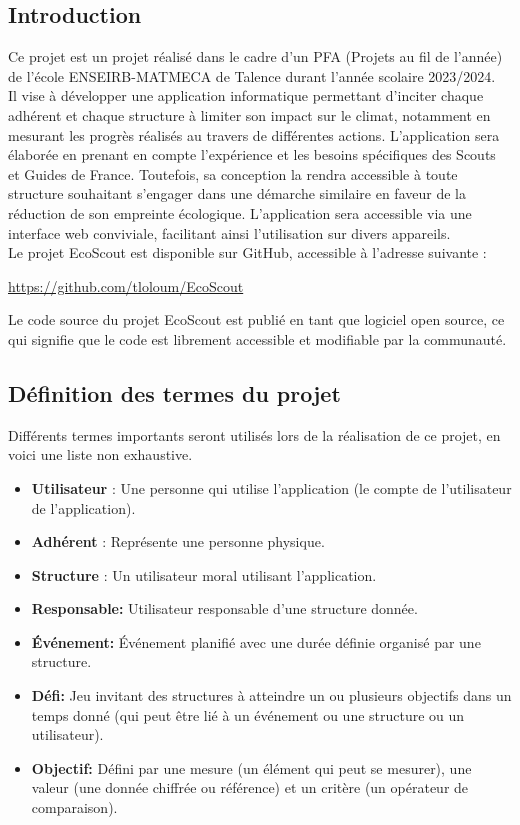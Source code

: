\subsection{Introduction}
Ce projet est un projet réalisé dans le cadre d'un PFA (Projets au fil de l'année)
de l'école ENSEIRB-MATMECA de Talence durant l'année scolaire 2023/2024. \\
\newline
Il vise à développer une application informatique permettant d’inciter chaque adhérent
et chaque structure à limiter son impact sur le climat, notamment en mesurant les 
progrès réalisés au travers de différentes actions. L'application sera élaborée en prenant en compte l'expérience et les besoins spécifiques des Scouts et Guides de France. Toutefois, sa conception la rendra accessible à toute structure souhaitant s'engager dans une démarche similaire en faveur de la réduction de son empreinte écologique. L'application sera accessible via une interface web conviviale, facilitant ainsi l'utilisation sur divers appareils. 
\\
\newline
Le projet EcoScout est disponible sur GitHub, accessible à l'adresse suivante :
\begin{center}
    \url{https://github.com/tloloum/EcoScout}
\end{center}
Le code source du projet EcoScout est publié en tant que logiciel open source, 
ce qui signifie que le code est librement accessible et modifiable par la communauté. 


\subsection{Définition des termes du projet}

Différents termes importants seront utilisés lors de la réalisation de ce projet, en voici une liste non exhaustive.
\begin{itemize}
    \item \textbf{Utilisateur} : Une personne qui utilise l'application (le compte de l'utilisateur de l'application).
    \item \textbf{Adhérent} : Représente une personne physique.
    \item \textbf{Structure} : Un utilisateur moral utilisant l'application.
    \item \textbf{Responsable:} Utilisateur responsable d'une structure donnée.
    \item \textbf{Événement:} Événement planifié avec une durée définie organisé par une structure.
    \item \textbf{Défi:} Jeu invitant des structures à atteindre un ou plusieurs objectifs dans un temps donné (qui peut être lié à un événement ou une structure ou un utilisateur).
    \item \textbf{Objectif:} Défini par une mesure (un élément qui peut se mesurer), une valeur (une donnée chiffrée ou référence) 
    et un critère (un opérateur de comparaison). 
\end{itemize}

